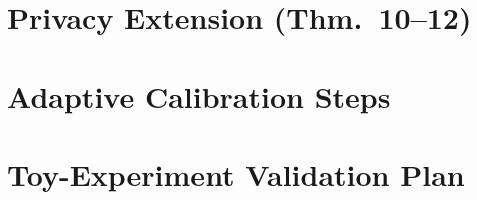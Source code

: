 \documentclass{article}
\begin{document}
\section{Privacy Extension (Thm.~10--12)}\label{app:dp}

\section{Adaptive Calibration Steps}\label{app:adaptive}

\section{Toy-Experiment Validation Plan}\label{app:toy}
\end{document}

